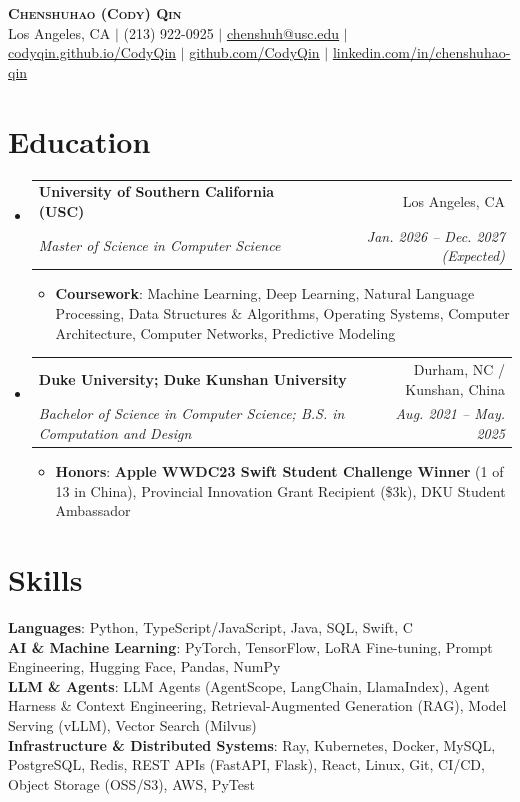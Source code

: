 \documentclass[letterpaper,10pt]{article}
\makeatletter
\newcommand{\resumeItem}[1]{
  \item\small{
    {#1}
  }
}
\newcommand{\resumeSubheading}[4]{
  \item
    \begin{tabular*}{0.97\textwidth}[t]{l@{\extracolsep{\fill}}r}
      \textbf{#1} & #2 \\
      \textit{\small#3} & \textit{\small #4} \\
    \end{tabular*}\vspace{-1pt}
}
\newcommand{\resumeSubHeadingListStart}{\begin{itemize}[leftmargin=0.15in, label={}, itemsep=2pt, topsep=2pt, parsep=0pt]}
\newcommand{\resumeSubHeadingListEnd}{\end{itemize}}
\newcommand{\resumeItemListStart}{\begin{itemize}[leftmargin=0.15in, itemsep=1pt, topsep=2pt, parsep=0pt]}
\newcommand{\resumeItemListEnd}{\end{itemize}\vspace{-3pt}}
\makeatother
\begin{document}
\begin{flushleft}
    \textbf{\Huge \scshape Chenshuhao (Cody) Qin} \\ \vspace{3pt}
    \small
    Los Angeles, CA $|$ (213) 922-0925 $|$
    \href{mailto:chenshuh@usc.edu}{\underline{chenshuh@usc.edu}} $|$
    \href{https://codyqin.github.io/CodyQin/}{\underline{codyqin.github.io/CodyQin}} $|$
    \href{https://github.com/CodyQin}{\underline{github.com/CodyQin}} $|$
    \href{https://www.linkedin.com/in/chenshuhao-qin/}{\underline{linkedin.com/in/chenshuhao-qin}}
\end{flushleft}

\section{Education}
  \resumeSubHeadingListStart
    \resumeSubheading
      {University of Southern California (USC)}{Los Angeles, CA}
      {Master of Science in Computer Science}{Jan. 2026 -- Dec. 2027 (Expected)}
      \resumeItemListStart
        \resumeItem{\textbf{Coursework}: Machine Learning, Deep Learning, Natural Language Processing, Data Structures \& Algorithms, Operating Systems, Computer Architecture, Computer Networks, Predictive Modeling}
      \resumeItemListEnd
    \resumeSubheading
      {Duke University; Duke Kunshan University}{Durham, NC / Kunshan, China}
      {Bachelor of Science in Computer Science; B.S. in Computation and Design}{Aug. 2021 -- May. 2025}
      \resumeItemListStart
        \resumeItem{\textbf{Honors}: \textbf{Apple WWDC23 Swift Student Challenge Winner} (1 of 13 in China), Provincial Innovation Grant Recipient (\$3k), DKU Student Ambassador}
      \resumeItemListEnd
  \resumeSubHeadingListEnd

\section{Skills}
 \begin{itemize}[leftmargin=0.15in, label={}, itemsep=0pt, topsep=1pt, parsep=0pt]
    \small{\item{
     \textbf{Languages}{: Python, TypeScript/JavaScript, Java, SQL, Swift, C} \\
     \textbf{AI \& Machine Learning}{: PyTorch, TensorFlow, LoRA Fine-tuning, Prompt Engineering, Hugging Face, Pandas, NumPy} \\
     \textbf{LLM \& Agents}{: LLM Agents (AgentScope, LangChain, LlamaIndex), Agent Harness \& Context Engineering, Retrieval-Augmented Generation (RAG), Model Serving (vLLM), Vector Search (Milvus)} \\
     \textbf{Infrastructure \& Distributed Systems}{: Ray, Kubernetes, Docker, MySQL, PostgreSQL, Redis, REST APIs (FastAPI, Flask), React, Linux, Git, CI/CD, Object Storage (OSS/S3), AWS, PyTest}
    }}
 \end{itemize}
\end{document}
